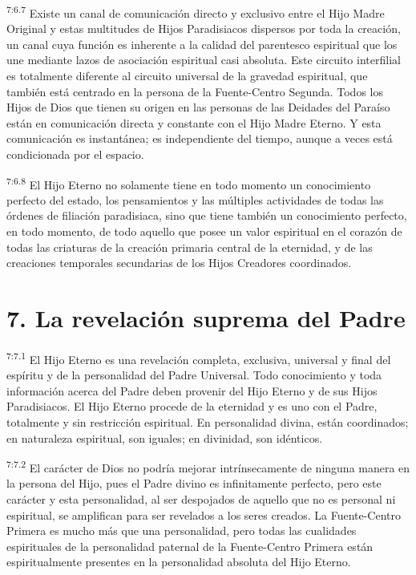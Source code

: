 \par
\textsuperscript{7:6.7} Existe un canal de comunicación directo y exclusivo entre el Hijo Madre Original y estas multitudes de Hijos Paradisiacos dispersos por toda la creación, un canal cuya función es inherente a la calidad del parentesco espiritual que los une mediante lazos de asociación espiritual casi absoluta. Este circuito interfilial es totalmente diferente al circuito universal de la gravedad espiritual, que también está centrado en la persona de la Fuente-Centro Segunda. Todos los Hijos de Dios que tienen su origen en las personas de las Deidades del Paraíso están en comunicación directa y constante con el Hijo Madre Eterno. Y esta comunicación es instantánea; es independiente del tiempo, aunque a veces está condicionada por el espacio.

\par
\textsuperscript{7:6.8} El Hijo Eterno no solamente tiene en todo momento un conocimiento perfecto del estado, los pensamientos y las múltiples actividades de todas las órdenes de filiación paradisiaca, sino que tiene también un conocimiento perfecto, en todo momento, de todo aquello que posee un valor espiritual en el corazón de todas las criaturas de la creación primaria central de la eternidad, y de las creaciones temporales secundarias de los Hijos Creadores coordinados.

\section*{7. La revelación suprema del Padre}
\par
\textsuperscript{7:7.1} El Hijo Eterno es una revelación completa, exclusiva, universal y final del espíritu y de la personalidad del Padre Universal. Todo conocimiento y toda información acerca del Padre deben provenir del Hijo Eterno y de sus Hijos Paradisiacos. El Hijo Eterno procede de la eternidad y es uno con el Padre, totalmente y sin restricción espiritual. En personalidad divina, están coordinados; en naturaleza espiritual, son iguales; en divinidad, son idénticos.

\par
\textsuperscript{7:7.2} El carácter de Dios no podría mejorar intrínsecamente de ninguna manera en la persona del Hijo, pues el Padre divino es infinitamente perfecto, pero este carácter y esta personalidad, al ser despojados de aquello que no es personal ni espiritual, se amplifican para ser revelados a los seres creados. La Fuente-Centro Primera es mucho más que una personalidad, pero todas las cualidades espirituales de la personalidad paternal de la Fuente-Centro Primera están espiritualmente presentes en la personalidad absoluta del Hijo Eterno.

